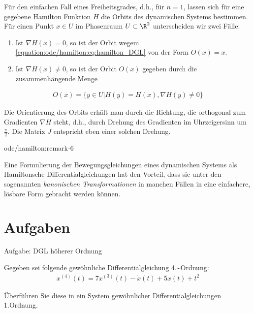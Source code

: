 \documentclass[letterpaper,10pt,german]{jupyterBook}
\begin{document}
\par
Für den einfachen Fall eines Freiheitsgrades, d.h., für \(n = 1\), lassen sich für eine gegebene Hamilton Funktion \(H\) die Orbits des dynamischen Systems bestimmen.
Für einen Punkt \(x \in U\) im Phasenraum \(U \subset \R^2\) unterscheiden wir zwei Fälle:
\begin{enumerate}

\item {} 
\par
Ist \(\nabla H(x) = 0\), so ist der Orbit wegem \eqref{equation:ode/hamilton:eq:hamilton_DGL} von der Form \(O(x) = {x}\).

\item {} 
\par
Ist \(\nabla H(x) \neq 0\), so ist der Orbit \(O(x)\) gegeben durch die zusammenhängende Menge

\end{enumerate}
\begin{align*}
O(x) = \{y \in U | H(y) = H(x), \nabla H(y) \neq 0\}
\end{align*}
\par
Die Orientierung des Orbits erhält man durch die Richtung, die orthogonal zum Gradienten \(\nabla H\) steht, d.h., durch Drehung des Gradienten im Uhrzeigersinn um \(\frac{\pi}{2}\).
Die Matrix \(J\) entspricht eben einer solchen Drehung.
\begin{remark}{}{ode/hamilton:remark-6}



\par
Eine Formulierung der Bewegungsgleichungen eines dynamischen Systems als Hamiltonsche Differentialgleichungen hat den Vorteil, dass sie unter den sogenannten \emph{kanonischen Transformationen} in manchen Fällen in eine einfachere, lösbare Form gebracht werden können.
\end{remark}


\section{Aufgaben}
\label{\detokenize{ode/ex:aufgaben}}\label{\detokenize{ode/ex::doc}}
\begin{emphBox}{}{}{Aufgabe: DGL höherer Ordnung}

\par
Gegeben sei folgende gewöhnliche Differentialgleichung 4.\textasciitilde{}Ordnung:
\begin{align*}
x^{(4)}(t) = 7 x^{(3)}(t) - \dot x(t) + 5 x(t) + t^2
\end{align*}
\par
Überführen Sie diese in ein System gewöhnlicher Differentialgleichungen 1.Ordnung.
\end{emphBox}
\end{document}
